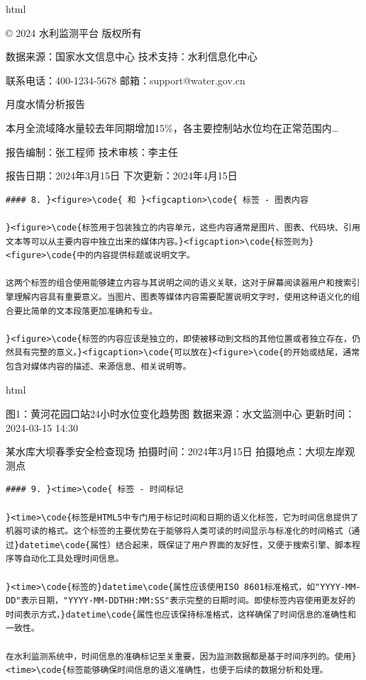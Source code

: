 html

© 2024 水利监测平台 版权所有

数据来源：国家水文信息中心 \textbar{} 技术支持：水利信息化中心

联系电话：400-1234-5678 \textbar{} 邮箱：support@water.gov.cn

月度水情分析报告

本月全流域降水量较去年同期增加15\%，各主要控制站水位均在正常范围内\ldots{}

报告编制：张工程师 \textbar{} 技术审核：李主任

报告日期：2024年3月15日 \textbar{} 下次更新：2024年4月15日

\begin{lstlisting}
#### 8. }<figure>\code{ 和 }<figcaption>\code{ 标签 - 图表内容

}<figure>\code{标签用于包装独立的内容单元，这些内容通常是图片、图表、代码块、引用文本等可以从主要内容中独立出来的媒体内容。}<figcaption>\code{标签则为}<figure>\code{中的内容提供标题或说明文字。

这两个标签的组合使用能够建立内容与其说明之间的语义关联，这对于屏幕阅读器用户和搜索引擎理解内容具有重要意义。当图片、图表等媒体内容需要配置说明文字时，使用这种语义化的组合要比简单的文本段落更加准确和专业。

}<figure>\code{标签的内容应该是独立的，即使被移动到文档的其他位置或者独立存在，仍然具有完整的意义。}<figcaption>\code{可以放在}<figure>\code{的开始或结尾，通常包含对媒体内容的描述、来源信息、相关说明等。

\end{lstlisting}

html

图1：黄河花园口站24小时水位变化趋势图 数据来源：水文监测中心 \textbar{} 更新时间：2024-03-15 14:30

某水库大坝春季安全检查现场 拍摄时间：2024年3月15日 \textbar{} 拍摄地点：大坝左岸观测点

\begin{lstlisting}
#### 9. }<time>\code{ 标签 - 时间标记

}<time>\code{标签是HTML5中专门用于标记时间和日期的语义化标签，它为时间信息提供了机器可读的格式。这个标签的主要优势在于能够将人类可读的时间显示与标准化的时间格式（通过}datetime\code{属性）结合起来，既保证了用户界面的友好性，又便于搜索引擎、脚本程序等自动化工具处理时间信息。

}<time>\code{标签的}datetime\code{属性应该使用ISO 8601标准格式，如"YYYY-MM-DD"表示日期，"YYYY-MM-DDTHH:MM:SS"表示完整的日期时间。即使标签内容使用更友好的时间表示方式，}datetime\code{属性也应该保持标准格式，这样确保了时间信息的准确性和一致性。

在水利监测系统中，时间信息的准确标记至关重要，因为监测数据都是基于时间序列的。使用}<time>\code{标签能够确保时间信息的语义准确性，也便于后续的数据分析和处理。

\end{lstlisting}

